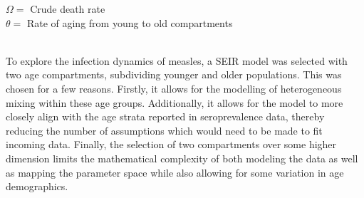 \documentclass[../Paper.tex]{subfiles}
\begin{document}
 $\Omega = $ Crude death rate \\
 $\theta = $ Rate of aging from young to old compartments \\
\\
\raggedright
To explore the infection dynamics of measles, a SEIR model was selected with two
age compartments, subdividing younger and older populations. This was chosen for a few
reasons. Firstly, it allows for the modelling of heterogeneous mixing within
these age groups. Additionally, it allows for the model to more closely
align with the age strata reported in seroprevalence data, thereby reducing the 
number of assumptions which would need to be made to fit incoming data. 
Finally, the selection of two compartments over some higher dimension limits 
the mathematical complexity of both modeling the data as well as mapping the 
parameter space while also allowing for some variation in age demographics.

\clearpage
\end{document}
